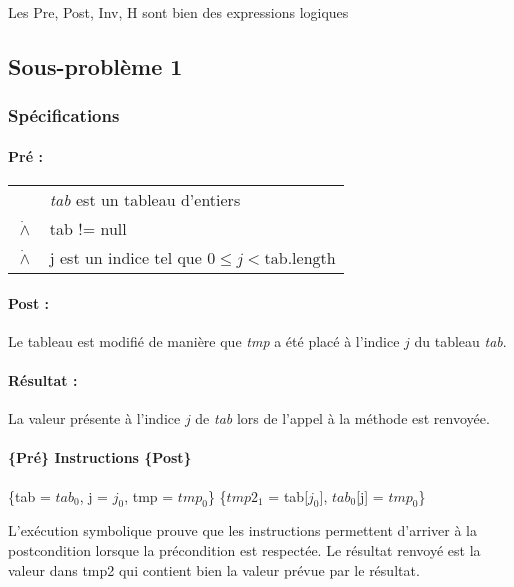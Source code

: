 
Les Pre, Post, Inv, H sont bien des expressions logiques

\subsection{Sous-problème 1}

\subsubsection{Spécifications}

\paragraph{Pré :}

\begin{tabular}{ll}
  & \textit{tab} est un tableau d'entiers \\
  $\dot{\wedge}$ & tab != null \\
  $\dot{\wedge}$ & j est un indice tel que $0 \le j < \mathrm{tab.length}$
\end{tabular}

\paragraph{Post :}

Le tableau est modifié de manière que \textit{tmp} a été placé à l'indice $j$ du tableau \textit{tab}.

\paragraph{Résultat :}

La valeur présente à l'indice $j$ de \textit{tab} lors de l'appel à la méthode est renvoyée.

\paragraph{ \{Pré\} Instructions \{Post\} }

\{tab = $tab_{0}$, j = $j_{0}$, tmp = $tmp_{0}$\}
\{$tmp2_{1}$ = tab[$j_{0}$], $tab_{0}$[j] = $tmp_{0}$\}

L'exécution symbolique prouve que les instructions permettent d'arriver à la postcondition lorsque la précondition est respectée. Le résultat renvoyé est la valeur dans tmp2 qui contient bien la valeur prévue par le résultat.

